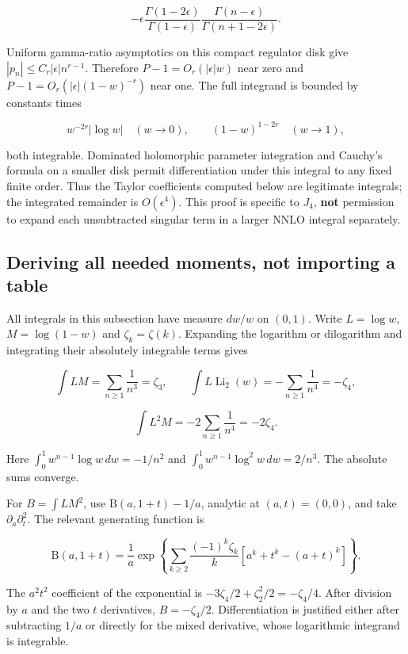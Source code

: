\documentclass[
  11pt,
]{article}
\begin{document}
\[-\epsilon\frac{\Gamma(1-2\epsilon)}{\Gamma(1-\epsilon)}
\frac{\Gamma(n-\epsilon)}{\Gamma(n+1-2\epsilon)}.\]

Uniform gamma-ratio asymptotics on this compact regulator disk give
\(|p_n|\leq C_r|\epsilon|n^{r-1}\). Therefore \(P-1=O_r(|\epsilon|w)\)
near zero and \(P-1=O_r(|\epsilon|(1-w)^{-r})\) near one. The full
integrand is bounded by constants times

\[w^{-2r}|\log w|\quad(w\to0),\qquad
(1-w)^{1-2r}\quad(w\to1),\]

both integrable. Dominated holomorphic parameter integration and
Cauchy's formula on a smaller disk permit differentiation under this
integral to any fixed finite order. Thus the Taylor coefficients
computed below are legitimate integrals; the integrated remainder is
\(O(\epsilon^4)\). This proof is specific to \(J_4\), \textbf{not}
permission to expand each unsubtracted singular term in a larger NNLO
integral separately.

\subsection{Deriving all needed moments, not importing a
table}\label{deriving-all-needed-moments-not-importing-a-table}

All integrals in this subsection have measure \(dw/w\) on \((0,1)\).
Write \(L=\log w\), \(M=\log(1-w)\) and \(\zeta_k=\zeta(k)\). Expanding
the logarithm or dilogarithm and integrating their absolutely integrable
terms gives

\[\int LM=\sum_{n\geq1}\frac1{n^3}=\zeta_3,\qquad
\int L\operatorname{Li}_2(w)=-\sum_{n\geq1}\frac1{n^4}=-\zeta_4,\]

\[\int L^2M=-2\sum_{n\geq1}\frac1{n^4}=-2\zeta_4.\]

Here \(\int_0^1w^{n-1}\log w\,dw=-1/n^2\) and
\(\int_0^1w^{n-1}\log^2w\,dw=2/n^3\). The absolute sums converge.

For \(B=\int LM^2\), use \(\mathrm B(a,1+t)-1/a\), analytic at
\((a,t)=(0,0)\), and take \(\partial_a\partial_t^2\). The relevant
generating function is

\[\mathrm B(a,1+t)=\frac1a\exp\left\{
\sum_{k\geq2}\frac{(-1)^k\zeta_k}{k}
[a^k+t^k-(a+t)^k]\right\}.\]

The \(a^2t^2\) coefficient of the exponential is
\(-3\zeta_4/2+\zeta_2^2/2=-\zeta_4/4\). After division by \(a\) and the
two \(t\) derivatives, \(B=-\zeta_4/2\). Differentiation is justified
either after subtracting \(1/a\) or directly for the mixed derivative,
whose logarithmic integrand is integrable.
\end{document}
